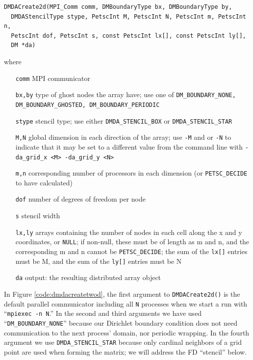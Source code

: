 \noindent\hrulefill
\begin{Verbatim}[fontsize=\small]
DMDACreate2d(MPI_Comm comm, DMBoundaryType bx, DMBoundaryType by,
  DMDAStencilType stype, PetscInt M, PetscInt N, PetscInt m, PetscInt n,
  PetscInt dof, PetscInt s, const PetscInt lx[], const PetscInt ly[],
  DM *da)
\end{Verbatim}
where
\small
\begin{itemize}[align=left]
\item[\texttt{comm}]   MPI communicator \\
\item[\texttt{bx,by}]  type of ghost nodes the array have; use one of \texttt{DM\_BOUNDARY\_NONE, DM\_BOUNDARY\_GHOSTED, DM\_BOUNDARY\_PERIODIC} \\
\item[\texttt{stype}] stencil type; use either \texttt{DMDA\_STENCIL\_BOX} or \texttt{DMDA\_STENCIL\_STAR} \\
\item[\texttt{M,N}]	   global dimension in each direction of the array; use \texttt{-M} and or \texttt{-N} to indicate that it may be set to a different value from the command line with \texttt{-da\_grid\_x <M> -da\_grid\_y <N>} \\
\item[\texttt{m,n}]   corresponding number of processors in each dimension (or \texttt{PETSC\_DECIDE} to have calculated) \\
\item[\texttt{dof}]     number of degrees of freedom per node \\
\item[\texttt{s}]       stencil width \\
\item[\texttt{lx,ly}]  arrays containing the number of nodes in each cell along the x and y coordinates, or \texttt{NULL}; if non-null, these must be of length as m and n, and the corresponding m and n cannot be \texttt{PETSC\_DECIDE}; the sum of the \texttt{lx[]} entries must be M, and the sum of the \texttt{ly[]} entries must be N \\
\item[\texttt{da}]      output: the resulting distributed array object 
\end{itemize}
\normalsize
\noindent\hrulefill
\medskip

\noindent In Figure \ref{code:dmdacreatetwod}, the first argument to \texttt{DMDACreate2d()} is the default parallel \MPI communicator including all \texttt{N} processes when we start a run with ``\texttt{mpiexec -n N}.''  In the second and third arguments we have used ``\texttt{DM\_BOUNDARY\_NONE}'' because our Dirichlet boundary condition does not need communication to the next process' domain, nor periodic wrapping.  In the fourth argument we use \texttt{DMDA\_STENCIL\_STAR} because only cardinal neighbors of a grid point are used when forming the matrix; we will address the FD ``stencil'' below.

